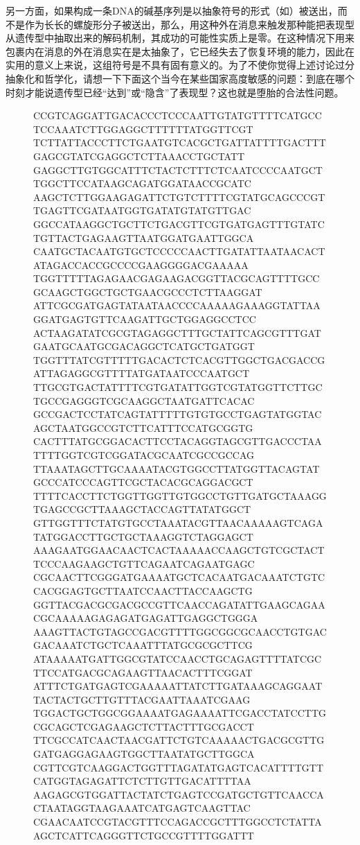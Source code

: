 另一方面，如果构成一条DNA的碱基序列是以抽象符号的形式（如）被送出，而不是作为长长的螺旋形分子被送出，那么，用这种外在消息来触发那种能把表现型从遗传型中抽取出来的解码机制，其成功的可能性实质上是零。在这种情况下用来包裹内在消息的外在消息实在是太抽象了，它已经失去了恢复环境的能力，因此在实用的意义上来说，这组符号是不具有固有意义的。为了不使你觉得上述讨论过分抽象化和哲学化，请想一下下面这个当今在某些国家高度敏感的问题：到底在哪个时刻才能说遗传型已经“达到”或“隐含”了表现型？这也就是堕胎的合法性问题。

\begin{figure}
\begin{dnaseq}
CCGTCAGGATTGACACCCTCCCAATTGTATGTTTTCATGCCTCCAAATCTTGGAGGCTTTTTTATGGTTCGT
TCTTATTACCCTTCTGAATGTCACGCTGATTATTTTGACTTTGAGCGTATCGAGGCTCTTAAACCTGCTATT
GAGGCTTGTGGCATTTCTACTCTTTCTCAATCCCCAATGCTTGGCTTCCATAAGCAGATGGATAACCGCATC
AAGCTCTTGGAAGAGATTCTGTCTTTTCGTATGCAGCCCGTTGAGTTCGATAATGGTGATATGTATGTTGAC
GGCCATAAGGCTGCTTCTGACGTTCGTGATGAGTTTGTATCTGTTACTGAGAAGTTAATGGATGAATTGGCA
CAATGCTACAATGTGCTCCCCCAACTTGATATTAATAACACTATAGACCACCGCCCCGAAGGGGACGAAAAA
TGGTTTTTAGAGAACGAGAAGACGGTTACGCAGTTTTGCCGCAAGCTGGCTGCTGAACGCCCTCTTAAGGAT
ATTCGCGATGAGTATAATAACCCCAAAAAGAAAGGTATTAAGGATGAGTGTTCAAGATTGCTGGAGGCCTCC
ACTAAGATATCGCGTAGAGGCTTTGCTATTCAGCGTTTGATGAATGCAATGCGACAGGCTCATGCTGATGGT
TGGTTTATCGTTTTTGACACTCTCACGTTGGCTGACGACCGATTAGAGGCGTTTTATGATAATCCCAATGCT
TTGCGTGACTATTTTCGTGATATTGGTCGTATGGTTCTTGCTGCCGAGGGTCGCAAGGCTAATGATTCACAC
GCCGACTCCTATCAGTATTTTTGTGTGCCTGAGTATGGTACAGCTAATGGCCGTCTTCATTTCCATGCGGTG
CACTTTATGCGGACACTTCCTACAGGTAGCGTTGACCCTAATTTTGGTCGTCGGATACGCAATCGCCGCCAG
TTAAATAGCTTGCAAAATACGTGGCCTTATGGTTACAGTATGCCCATCCCAGTTCGCTACACGCAGGACGCT
TTTTCACCTTCTGGTTGGTTGTGGCCTGTTGATGCTAAAGGTGAGCCGCTTAAAGCTACCAGTTATATGGCT
GTTGGTTTCTATGTGCCTAAATACGTTAACAAAAAGTCAGATATGGACCTTGCTGCTAAAGGTCTAGGAGCT
AAAGAATGGAACAACTCACTAAAAACCAAGCTGTCGCTACTTCCCAAGAAGCTGTTCAGAATCAGAATGAGC
CGCAACTTCGGGATGAAAATGCTCACAATGACAAATCTGTCCACGGAGTGCTTAATCCAACTTACCAAGCTG
GGTTACGACGCGACGCCGTTCAACCAGATATTGAAGCAGAACGCAAAAAGAGAGATGAGATTGAGGCTGGGA
AAAGTTACTGTAGCCGACGTTTTGGCGGCGCAACCTGTGACGACAAATCTGCTCAAATTTATGCGCGCTTCG
ATAAAAATGATTGGCGTATCCAACCTGCAGAGTTTTATCGCTTCCATGACGCAGAAGTTAACACTTTCGGAT
ATTTCTGATGAGTCGAAAAATTATCTTGATAAAGCAGGAATTACTACTGCTTGTTTACGAATTAAATCGAAG
TGGACTGCTGGCGGAAAATGAGAAAATTCGACCTATCCTTGCGCAGCTCGAGAAGCTCTTACTTTGCGACCT
TTCGCCATCAACTAACGATTCTGTCAAAAACTGACGCGTTGGATGAGGAGAAGTGGCTTAATATGCTTGGCA
CGTTCGTCAAGGACTGGTTTAGATATGAGTCACATTTTGTTCATGGTAGAGATTCTCTTGTTGACATTTTAA
AAGAGCGTGGATTACTATCTGAGTCCGATGCTGTTCAACCACTAATAGGTAAGAAATCATGAGTCAAGTTAC
CGAACAATCCGTACGTTTCCAGACCGCTTTGGCCTCTATTAAGCTCATTCAGGGTTCTGCCGTTTTGGATTT

\end{dnaseq}
\end{figure}
